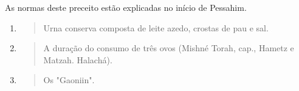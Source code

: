 As normas deste preceito estão explicadas no início de Pessahim.

\begin{enumerate}
\def\labelenumi{\arabic{enumi}.}
\setcounter{enumi}{370}
\item
  \begin{quote}
  Urna conserva composta de leite azedo, crostas de pau e sal.
  \end{quote}
\item
  \begin{quote}
  A duração do consumo de três ovos (Mishné Torah, cap., Hametz e
  Matzah. Halachá).
  \end{quote}
\item
  \begin{quote}
  Os "Gaoniin".
  \end{quote}
\end{enumerate}

